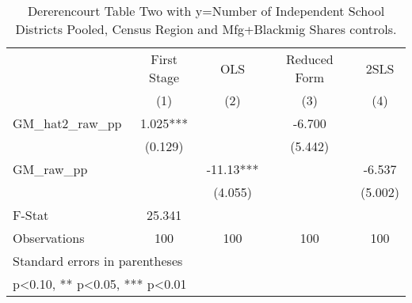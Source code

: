 \begin{table}[htbp]\centering
\def\sym#1{\ifmmode^{#1}\else\(^{#1}\)\fi}
\caption{Dererencourt Table Two with y=Number of Independent School Districts  Pooled, Census Region and Mfg+Blackmig Shares controls.}
\begin{tabular}{l*{4}{c}}
\toprule
                    & First Stage   &         OLS   &Reduced Form   &        2SLS   \\
                    &\multicolumn{1}{c}{(1)}   &\multicolumn{1}{c}{(2)}   &\multicolumn{1}{c}{(3)}   &\multicolumn{1}{c}{(4)}   \\
\midrule
GM\_hat2\_raw\_pp      &       1.025***&               &      -6.700   &               \\
                    &     (0.129)   &               &     (5.442)   &               \\
\addlinespace
GM\_raw\_pp           &               &      -11.13***&               &      -6.537   \\
                    &               &     (4.055)   &               &     (5.002)   \\
\midrule
F-Stat              &      25.341   &               &               &               \\
Observations        &         100   &         100   &         100   &         100   \\
\bottomrule
\multicolumn{5}{l}{\footnotesize Standard errors in parentheses}\\
\multicolumn{5}{l}{\footnotesize * p<0.10, ** p<0.05, *** p<0.01}\\
\end{tabular}
\end{table}
